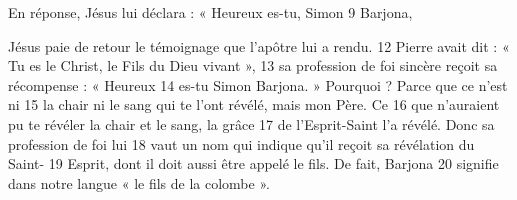 En réponse, Jésus lui déclara : « Heureux es-tu, Simon	 
9	 	Barjona,

Jésus paie de retour le témoignage que l'apôtre lui a rendu.	 
12	 	Pierre avait dit : « Tu es le Christ, le Fils du Dieu vivant »,	 
13	 	sa profession de foi sincère reçoit sa récompense : « Heureux	 
14	 	es-tu Simon Barjona. » Pourquoi ? Parce que ce n'est ni	 
15	 	la chair ni le sang qui te l'ont révélé, mais mon Père. Ce	 
16	 	que n'auraient pu te révéler la chair et le sang, la grâce	 
17	 	de l'Esprit-Saint l'a révélé. Donc sa profession de foi lui	 
18	 	vaut un nom qui indique qu'il reçoit sa révélation du Saint-	 
19	 	Esprit, dont il doit aussi être appelé le fils. De fait, Barjona	 
20	 	signifie dans notre langue « le fils de la colombe ».